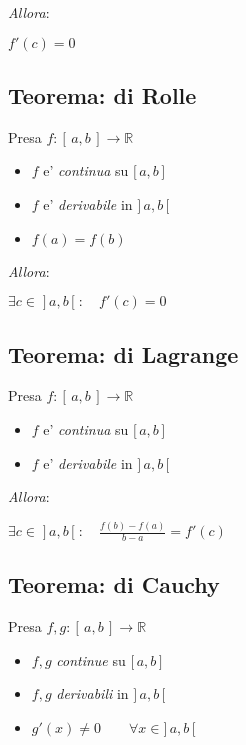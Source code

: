 \documentclass{article}
\begin{document}
\noindent\emph{Allora}:

\setlength{\parindent}{.25in}
$f'(c) = 0$

\subsection{Teorema: di Rolle}
Presa $f: [ \, a, b \, ] \longrightarrow \mathbb{R}$

\begin{itemize}
\item
  $f$ e' \emph{continua} su $\boldsymbol{[} \, a, b \, \boldsymbol{]}$
\item
  $f$ e' \emph{derivabile} in $\boldsymbol{]} \, a, b \, \boldsymbol{[}$
\item
  $f(a) = f(b)$
\end{itemize}

\noindent\emph{Allora}:

\setlength{\parindent}{.25in}
$\exists c \in \; ] \, a, b \, [ \; : \quad f'(c) = 0$

\subsection{Teorema: di Lagrange}
Presa $f: [ \, a, b \, ] \longrightarrow \mathbb{R}$

\begin{itemize}
\item
  $f$ e' \emph{continua} su $\boldsymbol{[} \, a, b \, \boldsymbol{]}$
\item
  $f$ e' \emph{derivabile} in $\boldsymbol{]} \, a, b \, \boldsymbol{[}$
\end{itemize}

\noindent \emph{Allora}:

\setlength{\parindent}{.25in}
$
  \exists c \in \; ] \, a, b \, [ \; : \quad
  \frac{f(b) - f(a)}{b - a} = f'(c)
$

\subsection{Teorema: di Cauchy}
Presa $f, g: [ \, a, b \, ] \longrightarrow \mathbb{R}$

\begin{itemize}
\item
  $f, g$ \emph{continue} su $\boldsymbol{[} \, a, b \, \boldsymbol{]}$
\item
  $f, g$ \emph{derivabili} in $\boldsymbol{]} \, a, b \, \boldsymbol{[}$
\item
  $g'(x) \neq 0 \qquad \forall x \in \boldsymbol{]} \, a, b \, \boldsymbol{[}$
\end{itemize}
\end{document}
